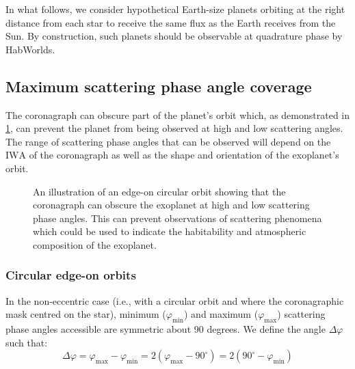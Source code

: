 \documentclass[
    usenatbib,
]{mnras}
\newcommand{\timmy}[1]{\textcolor{red}{[\textbf{Timmy:} #1]}} %
\newcommand{\IWA}{\ensuremath{\mathrm{IWA}}}
\begin{document}
In what follows, we consider hypothetical Earth-size planets orbiting at the right distance from each star to receive the same flux as the Earth receives from the Sun.
%
By construction, such planets should be observable at quadrature phase by HabWorlds. 


\subsection{Maximum scattering phase angle coverage}
\label{sec:Delta_phi}

The coronagraph can obscure part of the planet's orbit which, as demonstrated in \cref{fig:annotated-orbit}, can prevent the planet from being observed at high and low scattering angles. 
%
The range of scattering phase angles that can be observed will depend on the \IWA{} of the coronagraph as well as the shape and orientation of the exoplanet's orbit.

\begin{figure}
    \centering
    
    \caption{
        An illustration of an edge-on circular orbit showing that the coronagraph can obscure the exoplanet at high and low scattering phase angles.
        This can prevent observations of scattering phenomena which could be used to indicate the habitability and atmospheric composition of the exoplanet. 
    }
    \label{fig:annotated-orbit}
\end{figure}


\subsubsection{Circular edge-on orbits}


In the non-eccentric case (i.e., with a circular orbit and where the coronagraphic mask centred on the star), minimum ($\varphi_\mathrm{min}$) and maximum ($\varphi_\mathrm{max}$) scattering phase angles accessible are symmetric about 90 degrees. 
%
We define the angle $\Delta \varphi$ such that: 
\begin{equation}
 \label{eq:Delta_phi}
    \Delta \varphi 
    = \varphi_\mathrm{max} - \varphi_\mathrm{min}
    =  2(\varphi_\mathrm{max} - 90^\circ) 
    =  2(90^\circ-\varphi_\mathrm{min} ) 
\end{equation}
\end{document}
